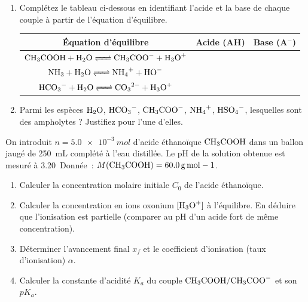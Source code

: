 \documentclass[11pt]{article}
\begin{document}
\begin{exercice}
\begin{enumerate}
    \item Complétez le tableau ci-dessous en identifiant l'acide et la base de chaque couple à partir de l'équation d'équilibre.
    \begin{tabular}{|c|c|c|}
    \hline
    \textbf{Équation d'équilibre} & \textbf{Acide (AH)} & \textbf{Base (A$^-$)} \\
    \hline
    $\ce{CH3COOH + H2O <=> CH3COO- + H3O+}$ & & \\
    \hline
    $\ce{NH3 + H2O <=> NH4+ + HO-}$ & & \\
    \hline
    $\ce{HCO3- + H2O <=> CO3^{2-} + H3O+}$ & & \\
    \hline
    \end{tabular}
    \item Parmi les espèces $\ce{H2O}$, $\ce{HCO3-}$, $\ce{CH3COO-}$, $\ce{NH4+}$, $\ce{HSO4-}$, lesquelles sont des ampholytes ? Justifiez pour l'une d'elles.
\end{enumerate}
\end{exercice}

\begin{exercice}
On introduit $n = \SI{5,0e-3}{mol}$ d'acide éthanoïque $\ce{CH3COOH}$ dans un ballon jaugé de \SI{250}{mL} complété à l'eau distillée. Le pH de la solution obtenue est mesuré à \SI{3,20}. Donnée : $M(\ce{CH3COOH}) = \SI{60,0}{g.mol-1}$.
\begin{enumerate}
    \item Calculer la concentration molaire initiale $C_0$ de l'acide éthanoïque.
    \item Calculer la concentration en ions oxonium $[\ce{H3O+}]$ à l'équilibre. En déduire que l'ionisation est partielle (comparer au pH d'un acide fort de même concentration).
    \item Déterminer l'avancement final $x_f$ et le coefficient d'ionisation (taux d'ionisation) $\alpha$.
    \item Calculer la constante d'acidité $K_a$ du couple $\ce{CH3COOH/CH3COO-}$ et son $pK_a$.
\end{enumerate}
\end{exercice}
\end{document}
